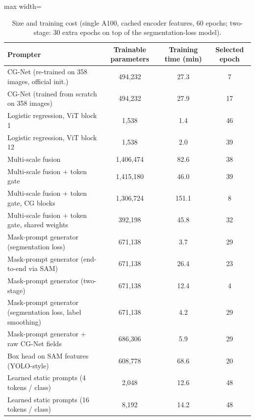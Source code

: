 \begin{table}[htbp]
\centering
\small
\begin{adjustbox}{max width=\linewidth}
\begin{tabular}{lccc}
\toprule
Prompter & Trainable parameters & Training time (min) & Selected epoch \\
\midrule
CG-Net (re-trained on 358 images, official init.) & 494,232 & 27.3 & 7 \\
CG-Net (trained from scratch on 358 images) & 494,232 & 27.9 & 17 \\
Logistic regression, ViT block 1 & 1,538 & 1.4 & 46 \\
Logistic regression, ViT block 12 & 1,538 & 2.0 & 39 \\
Multi-scale fusion & 1,406,474 & 82.6 & 38 \\
Multi-scale fusion + token gate & 1,415,180 & 46.0 & 39 \\
Multi-scale fusion + token gate, CG blocks & 1,306,724 & 151.1 & 8 \\
Multi-scale fusion + token gate, shared weights & 392,198 & 45.8 & 32 \\
Mask-prompt generator (segmentation loss) & 671,138 & 3.7 & 29 \\
Mask-prompt generator (end-to-end via SAM) & 671,138 & 26.4 & 23 \\
Mask-prompt generator (two-stage) & 671,138 & 12.4 & 4 \\
Mask-prompt generator (segmentation loss, label smoothing) & 671,138 & 4.2 & 29 \\
Mask-prompt generator + raw CG-Net fields & 686,306 & 5.9 & 29 \\
Box head on SAM features (YOLO-style) & 608,778 & 68.6 & 20 \\
Learned static prompts (4 tokens / class) & 2,048 & 12.6 & 48 \\
Learned static prompts (16 tokens / class) & 8,192 & 14.2 & 48 \\
\bottomrule
\end{tabular}
\end{adjustbox}
\caption{Size and training cost (single A100, cached encoder features, 60 epochs; two-stage: 30 extra epochs on top of the segmentation-loss model).}
\label{tab:cost_infused_mlp1}
\end{table}
